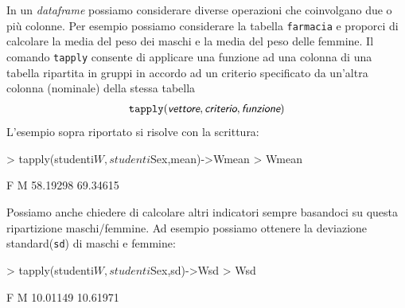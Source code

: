 \documentclass[onecolumn,12pt]{book}
\newcommand{\varia}[1]{\textsl{\textsf{#1}}}
\begin{document}
In un \emph{dataframe} possiamo considerare diverse operazioni che coinvolgano due o pi\`u colonne. Per esempio possiamo considerare la tabella \texttt{farmacia} e proporci di calcolare la media del peso dei maschi e la media del peso delle femmine. Il comando \texttt{tapply}  consente di applicare una funzione ad una colonna di una tabella ripartita in gruppi in accordo ad un criterio specificato da un'altra colonna (nominale) della stessa tabella
\begin{eqnarray*}
\texttt{tapply}(\varia{vettore},\varia{criterio} ,\varia{funzione})\end{eqnarray*}
L'esempio sopra riportato si risolve con la scrittura:
\begin{Schunk}
\begin{Sinput}
> tapply(studenti$W, studenti$Sex,mean)->Wmean
> Wmean
\end{Sinput}
\begin{Soutput}
       F        M 
58.19298 69.34615 
\end{Soutput}
\end{Schunk}
Possiamo anche chiedere di calcolare altri indicatori sempre basandoci  su questa ripartizione maschi/femmine.
Ad esempio possiamo ottenere la deviazione standard(\texttt{sd}) di maschi e femmine:
\begin{Schunk}
\begin{Sinput}
> tapply(studenti$W, studenti$Sex,sd)->Wsd
> Wsd
\end{Sinput}
\begin{Soutput}
       F        M 
10.01149 10.61971 
\end{Soutput}
\end{Schunk}
\end{document}
